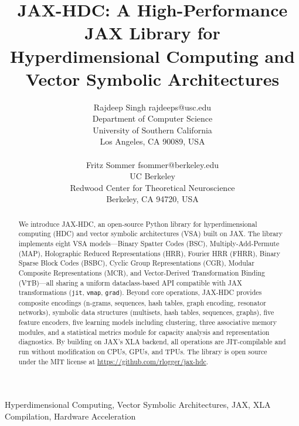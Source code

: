 \documentclass[twoside,11pt]{article}
\begin{document}
\title{JAX-HDC: A High-Performance JAX Library for \\ Hyperdimensional Computing and Vector Symbolic Architectures}

\author{\name Rajdeep Singh \email rajdeeps@usc.edu \\
       \addr Department of Computer Science\\
       University of Southern California\\
       Los Angeles, CA 90089, USA\\
       \\
       \name Fritz Sommer \email fsommer@berkeley.edu \\
       \addr UC Berkeley\\
       Redwood Center for Theoretical Neuroscience\\
       Berkeley, CA 94720, USA}

\maketitle

\begin{abstract}
We introduce JAX-HDC, an open-source Python library for hyperdimensional computing (HDC) and vector symbolic architectures (VSA) built on JAX. The library implements eight VSA models---Binary Spatter Codes (BSC), Multiply-Add-Permute (MAP), Holographic Reduced Representations (HRR), Fourier HRR (FHRR), Binary Sparse Block Codes (BSBC), Cyclic Group Representations (CGR), Modular Composite Representations (MCR), and Vector-Derived Transformation Binding (VTB)---all sharing a uniform dataclass-based API compatible with JAX transformations (\texttt{jit}, \texttt{vmap}, \texttt{grad}). Beyond core operations, JAX-HDC provides composite encodings (n-grams, sequences, hash tables, graph encoding, resonator networks), symbolic data structures (multisets, hash tables, sequences, graphs), five feature encoders, five learning models including clustering, three associative memory modules, and a statistical metrics module for capacity analysis and representation diagnostics. By building on JAX's XLA backend, all operations are JIT-compilable and run without modification on CPUs, GPUs, and TPUs. The library is open source under the MIT license at \url{https://github.com/rlogger/jax-hdc}.
\end{abstract}

\begin{keywords}
Hyperdimensional Computing, Vector Symbolic Architectures, JAX, XLA Compilation, Hardware Acceleration
\end{keywords}
\end{document}
